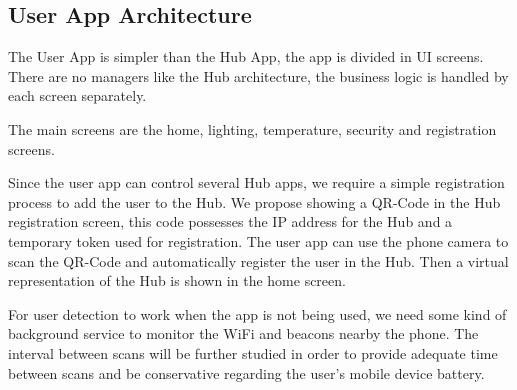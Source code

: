 \subsection{User App Architecture}
The User App is simpler than the Hub App, the app is divided in \ac{UI} screens. There are no managers like the Hub architecture, the business logic is handled by each screen separately. 


The main screens are the home, lighting, temperature, security and registration screens.

Since the user app can control several Hub apps, we require a simple registration process to add the user to the Hub. We propose showing a QR-Code in the Hub registration screen, this code possesses the \ac{IP} address for the Hub and a temporary token used for registration. The user app can use the phone camera to scan the QR-Code and automatically register the user in the Hub. Then a virtual representation of the Hub is shown in the home screen.

For user detection to work when the app is not being used, we need some kind of background service to monitor the \ac{WiFi} and beacons nearby the phone. The interval between scans will be further studied in order to provide adequate time between scans and be conservative regarding the user's mobile device battery.


